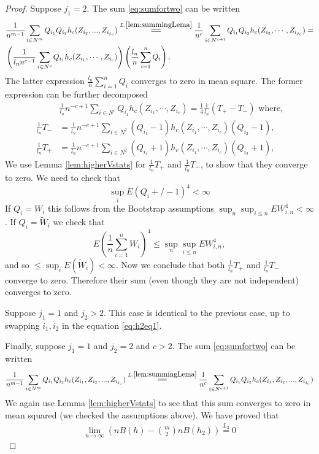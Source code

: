 \documentclass{article} %
\newcommand{\ev}{E}
\begin{document}
\begin{proof}
Suppose  $j_1 = 2$. The sum  \ref{eq:sumfortwo} can be written
\begin{align}
 \label{eq:h2eq1}
 \begin{split}
&\frac{1} {n^{m-1}}  \sum_{i \in N^m}  Q_{i_1} Q_{i_2} h_c(Z_{i_2},...,Z_{i_{j_c}})  
\overset{L.\ref{lem:summingLema}}{=\joinrel=} \frac{1} {n^c}  \sum_{i \in N^{c+1}}   Q_{i_1} Q_{i_2} h_c(Z_{i_2},\cdots,Z_{i_{j_c}}) = \\
& \left( \frac{1}{l_n n^{c-1} } \sum_{i \in N^c} Q_{i_1}  h_c(Z_{i_1}, \cdots ,Z_{i_c}) \right) \left( \frac {l_n}{n} \sum_{i=1}^{n}Q_i \right).
\end{split}
\end{align}
The latter expression $\frac {l_n}{n} \sum_{i=1}^{n}Q_i$ converges to zero in mean square. The former expression can be further decomposed
\begin{align*}
& \frac{1}{ l_n} n^{-c+1} \sum_{i \in N^c} Q_{i_1}  h_c(Z_{i_1}, \cdots ,Z_{i_c}) = \frac 1 4 \frac{1}{l_n} (T_{+}-T_{-}) \text{ where,} \\   
\frac{1}{l_n} T_{-} &=   \frac{1}{l_n} n^{-c+1} \sum_{i \in N^2} (Q_{i_1}-1)h_c(Z_{i_1}, \cdots ,Z_{i_c})(Q_{i_2}-1), \\
\frac{1}{l_n} T_{+} &= \frac{1}{l_n} n^{-c+1} \sum_{i \in N^2}  (Q_{i_1}+1)h_c(Z_{i_1}, \cdots ,Z_{i_c})(Q_{i_2}+1),
\end{align*}
We  use Lemma \ref{lem:higherVstats} for $\frac{1}{l_n} T_{+}$ and $\frac{1}{l_n} T_{-}$, to show that they converge to zero. We  need to check that 
\[
 \sup_{i } E ( Q_{i}+/-1)^4   <\infty
\]
If $Q_i = W_i$ this follows from the Bootstrap assumptions $\sup_{n} \sup_{i \leq n} \ev W_{i,n}^{4} < \infty$. If $Q_i = \tilde W_i$ we check that  
\[
 E (\frac 1 n \sum_{i=1}^n W_i)^4  \leq \sup_{n} \sup_{i \leq n} \ev W_{i,n}^{4},
\]
and so $\leq  \sup_{i} \ev (\tilde W_i)  < \infty$. Now we conclude that both $\frac{1}{l_n} T_{+}$ and $\frac{1}{l_n} T_{-}$ converge to zero. Therefore their sum (even though they are not independent) converges to zero. 

Suppose $j_1=1$ and $j_2>2$. This case is identical to the previous case, up to swapping $i_1,i_2$ in the equation \ref{eq:h2eq1}.  

Finally, suppose $j_1=1$ and $j_2=2$ and $c>2$. The sum  \ref{eq:sumfortwo} can be written
\begin{align*}
\frac{1} {n^{m-1}}  \sum_{i \in N^m}  Q_{i_1} Q_{i_2} h_c(Z_{i_1},Z_{i_2},...,Z_{i_{j_c}})  \overset{L.\ref{lem:summingLema}}{=\joinrel=} \frac{1} {n^c}  \sum_{i \in N^{c+1}}   Q_{i_1} Q_{i_2}  h_c(Z_{i_1},Z_{i_2},...,Z_{i_{j_c}})
\end{align*}
We  again use Lemma \ref{lem:higherVstats} to see that this sum converges to zero in mean squared (we checked the assumptions above). We have proved that 
\begin{align*}
  \lim_{n \to \infty} \left( n B(h) -  \binom m 2  n B(h_2)  \right) \overset{L_2}{=} 0
\end{align*}
\end{proof}
\end{document}
